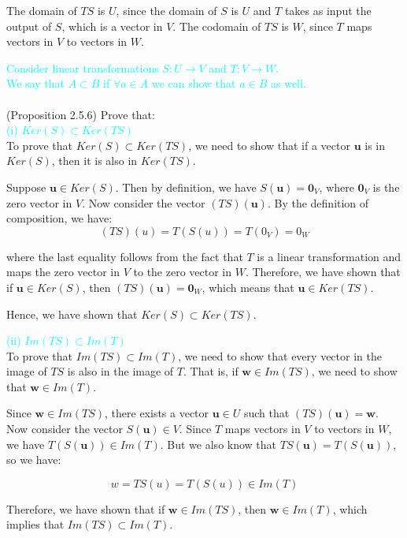 \documentclass[fontsize=12pt]{scrartcl}
\begin{document}
\noindent
The domain of $TS$ is $U$, since the domain of $S$ is $U$ and $T$ takes as input the output of $S$, which is a vector in $V$. The codomain of $TS$ is $W$, since $T$ maps vectors in $V$ to vectors in $W$.

\newpage

\noindent
\textcolor{cyan}{Consider linear transformations $S: U \to V$ and $T: V \to W$.\\
We say that $A \subset B$ if $\forall a \in A$ we can show that $a \in B$ as well.}\\
\\
(Proposition 2.5.6) Prove that:\\
\indent \textcolor{cyan}{(i) $Ker(S) \subset Ker(TS)$}\\
To prove that $Ker(S) \subset Ker(TS)$, we need to show that if a vector $\mathbf{u}$ is in $Ker(S)$, then it is also in $Ker(TS)$.

\noindent
Suppose $\mathbf{u} \in Ker(S)$. Then by definition, we have $S(\mathbf{u}) = \mathbf{0}_V$, where $\mathbf{0}_V$ is the zero vector in $V$. Now consider the vector $(TS)(\mathbf{u})$. By the definition of composition, we have:
$$(TS)(u) = T(S(u)) = T(0_V) = 0_W $$

\noindent
where the last equality follows from the fact that $T$ is a linear transformation and maps the zero vector in $V$ to the zero vector in $W$. Therefore, we have shown that if $\mathbf{u} \in Ker(S)$, then $(TS)(\mathbf{u}) = \mathbf{0}_W$, which means that $\mathbf{u} \in Ker(TS)$.

\noindent
Hence, we have shown that $Ker(S) \subset Ker(TS)$.

\indent \textcolor{cyan}{(ii) $Im(TS) \subset Im(T)$}\\
\noindent
To prove that $Im(TS) \subset Im(T)$, we need to show that every vector in the image of $TS$ is also in the image of $T$. That is, if $\mathbf{w} \in Im(TS)$, we need to show that $\mathbf{w} \in Im(T)$.

\noindent
Since $\mathbf{w} \in Im(TS)$, there exists a vector $\mathbf{u} \in U$ such that $(TS)(\mathbf{u}) = \mathbf{w}$. Now consider the vector $S(\mathbf{u}) \in V$. Since $T$ maps vectors in $V$ to vectors in $W$, we have $T(S(\mathbf{u})) \in Im(T)$. But we also know that $TS(\mathbf{u}) = T(S(\mathbf{u}))$, so we have:

$$w = TS(u) = T(S(u)) \in Im(T) $$

\noindent
Therefore, we have shown that if $\mathbf{w} \in Im(TS)$, then $\mathbf{w} \in Im(T)$, which implies that $Im(TS) \subset Im(T)$.
\end{document}
